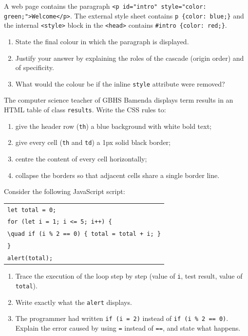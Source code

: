 \documentclass[11pt]{article}
\begin{document}
\begin{exercice}
A web page contains the paragraph \texttt{<p id="intro" style="color: green;">Welcome</p>}. The external style sheet contains \texttt{p \{color: blue;\}} and the internal \texttt{<style>} block in the \texttt{<head>} contains \texttt{\#intro \{color: red;\}}.
\begin{enumerate}
\item State the final colour in which the paragraph is displayed.
\item Justify your answer by explaining the roles of the cascade (origin order) and of specificity.
\item What would the colour be if the inline \texttt{style} attribute were removed?
\end{enumerate}
\end{exercice}

\begin{exercice}
The computer science teacher of GBHS Bamenda displays term results in an HTML table of class \texttt{results}. Write the CSS rules to:
\begin{enumerate}
\item give the header row (\texttt{th}) a blue background with white bold text;
\item give every cell (\texttt{th} and \texttt{td}) a 1px solid black border;
\item centre the content of every cell horizontally;
\item collapse the borders so that adjacent cells share a single border line.
\end{enumerate}
\end{exercice}

\begin{exercice}
Consider the following JavaScript script:
\begin{center}
\begin{tabular}{l}
\texttt{let total = 0;}\\
\texttt{for (let i = 1; i <= 5; i++) \{}\\
\texttt{\textbackslash{}quad if (i \% 2 == 0) \{ total = total + i; \}}\\
\texttt{\}}\\
\texttt{alert(total);}
\end{tabular}
\end{center}
\begin{enumerate}
\item Trace the execution of the loop step by step (value of \texttt{i}, test result, value of \texttt{total}).
\item Write exactly what the \texttt{alert} displays.
\item The programmer had written \texttt{if (i = 2)} instead of \texttt{if (i \% 2 == 0)}. Explain the error caused by using \texttt{=} instead of \texttt{==}, and state what happens.
\end{enumerate}
\end{exercice}
\end{document}
